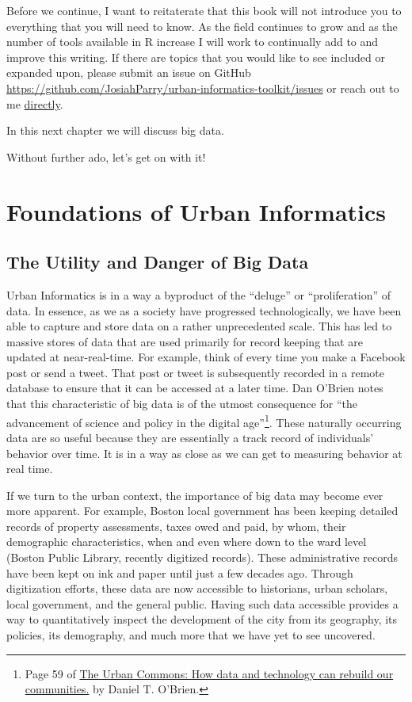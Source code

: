\documentclass[
]{book}
\begin{document}
Before we continue, I want to reitaterate that this book will not introduce you to everything that you will need to know. As the field continues to grow and as the number of tools available in R increase I will work to continually add to and improve this writing. If there are topics that you would like to see included or expanded upon, please submit an issue on GitHub \url{https://github.com/JosiahParry/urban-informatics-toolkit/issues} or reach out to me \href{mailto:josiah.parry@gmail.com?subject=\%5BUITK\%5D\%20Feedback}{directly}.

In this next chapter we will discuss big data.

Without further ado, let's get on with it!

\hypertarget{part-foundations-of-urban-informatics}{%
\part{Foundations of Urban Informatics}\label{part-foundations-of-urban-informatics}}

\hypertarget{the-utility-and-danger-of-big-data}{%
\chapter{The Utility and Danger of Big Data}\label{the-utility-and-danger-of-big-data}}

Urban Informatics is in a way a byproduct of the ``deluge'' or ``proliferation'' of data. In essence, as we as a society have progressed technologically, we have been able to capture and store data on a rather unprecedented scale. This has led to massive stores of data that are used primarily for record keeping that are updated at near-real-time. For example, think of every time you make a Facebook post or send a tweet. That post or tweet is subsequently recorded in a remote database to ensure that it can be accessed at a later time. Dan O'Brien notes that this characteristic of big data is of the utmost consequence for ``the advancement of science and policy in the digital age''\footnote{Page 59 of \href{https://www.hup.harvard.edu/catalog.php?isbn=9780674975293}{The Urban Commons: How data and technology can rebuild our communities.} by Daniel T. O'Brien.}. These naturally occurring data are so useful because they are essentially a track record of individuals' behavior over time. It is in a way as close as we can get to measuring behavior at real time.

If we turn to the urban context, the importance of big data may become ever more apparent. For example, Boston local government has been keeping detailed records of property assessments, taxes owed and paid, by whom, their demographic characteristics, when and even where down to the ward level (Boston Public Library, recently digitized records). These administrative records have been kept on ink and paper until just a few decades ago. Through digitization efforts, these data are now accessible to historians, urban scholars, local government, and the general public. Having such data accessible provides a way to quantitatively inspect the development of the city from its geography, its policies, its demography, and much more that we have yet to see uncovered.
\end{document}
